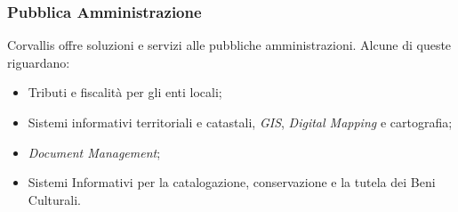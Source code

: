 \subsubsection{Pubblica Amministrazione}
\label{1.2.4}
Corvallis offre soluzioni e servizi alle pubbliche amministrazioni. Alcune di queste riguardano:
\begin{itemize}
\item Tributi e fiscalità per gli enti locali;
\item Sistemi informativi territoriali e catastali, \emph{GIS}, \emph{Digital Mapping} e cartografia;
\item \emph{Document Management};
\item Sistemi Informativi per la catalogazione, conservazione e la tutela dei Beni Culturali.\\
\end{itemize}
